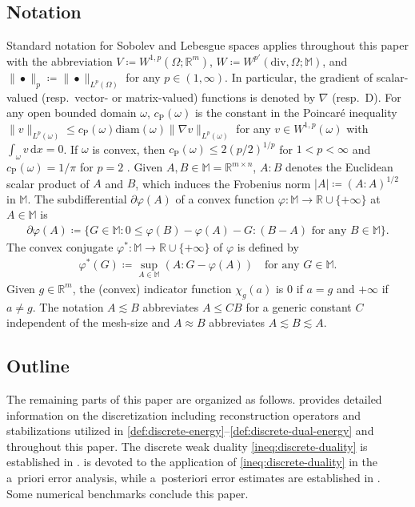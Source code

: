 \documentclass[a4paper]{amsart}
\numberwithin{equation}{section}
\newcommand{\R}{\mathbb{R}}
\renewcommand{\d}[1]{\,\mathrm{d}#1}
\renewcommand{\div}{\mathrm{div}}
\newcommand{\D}{\mathrm{D}}
\newcommand{\M}{\mathbb{M}}
\theoremstyle{remark}
\begin{document}
\subsection{Notation}
Standard notation for Sobolev and Lebesgue spaces applies throughout this paper with the abbreviation $V \coloneqq W^{1,p}(\Omega;\R^m)$, $W \coloneqq W^{p'}(\div,\Omega;\M)$, and $\|\bullet\|_p \coloneqq \|\bullet\|_{L^p(\Omega)}$ for any $p \in (1,\infty)$.
In particular, the gradient of scalar-valued (resp.~vector- or matrix-valued) functions is denoted by $\nabla$ (resp.~$\D$).
For any open bounded domain $\omega$, $c_\mathrm{P}(\omega)$ is the constant in the Poincar\'e inequality $\|v\|_{L^p(\omega)} \leq c_\mathrm{P}(\omega)\mathrm{diam}(\omega) \|\nabla v\|_{L^p(\omega)}$ for any $v \in W^{1,p}(\omega)$ with $\int_\omega v \d{x} = 0$.
If $\omega$ is convex, then $c_\mathrm{P}(\omega) \leq 2(p/2)^{1/p}$ \cite[Theorem 1.2]{ChuaWeeden2006} for $1 < p < \infty$ and $c_\mathrm{P}(\omega) = 1/\pi$ for $p = 2$ \cite{Bebendorf2003}.
Given $A, B \in \M = \R^{m \times n}$, $A:B$ denotes the Euclidean scalar product of $A$ and $B$, which induces the Frobenius norm $|A| \coloneqq (A:A)^{1/2}$ in $\M$.
The subdifferential $\partial \varphi(A)$ of a convex function $\varphi : \M \to \R \cup \{+\infty\}$ at $A \in \mathbb{M}$ is
\begin{align}\label{def:subdifferential}
	\partial \varphi(A) \coloneqq \{G \in \mathbb{M} : 0 \leq \varphi(B) - \varphi(A) - G:(B - A) \text{ for any } B \in \mathbb{M}\}.
\end{align}
The convex conjugate $\varphi^* : \M \to \mathbb{R} \cup \{+\infty\}$ of $\varphi$ is defined by
\begin{align*}
	\varphi^*(G) \coloneqq \sup_{A \in \M} (A : G - \varphi(A)) \quad\text{for any } G \in \M.
\end{align*}
Given $g \in \R^m$, the (convex) indicator function $\chi_{g}(a)$ is $0$ if $a = g$ and $+\infty$ if $a \neq g$.
The notation $A \lesssim B$ abbreviates $A \leq CB$ for a generic constant $C$ independent of the mesh-size and $A \approx B$ abbreviates $A \lesssim B \lesssim A$.

\subsection{Outline}
The remaining parts of this paper are organized as follows.
 provides detailed information on the discretization including reconstruction operators and stabilizations utilized in \eqref{def:discrete-energy}--\eqref{def:discrete-dual-energy} and throughout this paper.
The discrete weak duality \eqref{ineq:discrete-duality} is established in .
 is devoted to the application of \eqref{ineq:discrete-duality} in the a~priori error analysis, while a~posteriori error estimates are established in .
Some numerical benchmarks conclude this paper.
\end{document}

